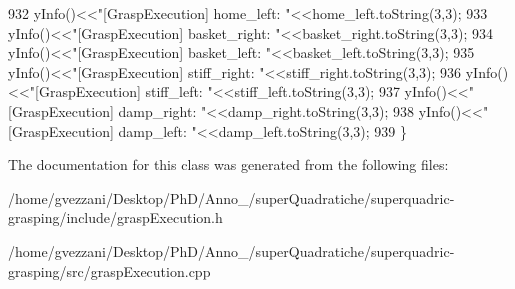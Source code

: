 \begin{DoxyCode}
932     yInfo()<<\textcolor{stringliteral}{"[GraspExecution] home\_left:       "}<<home\_left.toString(3,3);
933     yInfo()<<\textcolor{stringliteral}{"[GraspExecution] basket\_right:    "}<<basket\_right.toString(3,3);
934     yInfo()<<\textcolor{stringliteral}{"[GraspExecution] basket\_left:     "}<<basket\_left.toString(3,3);
935     yInfo()<<\textcolor{stringliteral}{"[GraspExecution] stiff\_right:     "}<<stiff\_right.toString(3,3);
936     yInfo()<<\textcolor{stringliteral}{"[GraspExecution] stiff\_left:      "}<<stiff\_left.toString(3,3);
937     yInfo()<<\textcolor{stringliteral}{"[GraspExecution] damp\_right:      "}<<damp\_right.toString(3,3);
938     yInfo()<<\textcolor{stringliteral}{"[GraspExecution] damp\_left:       "}<<damp\_left.toString(3,3);
939 \}
\end{DoxyCode}


The documentation for this class was generated from the following files\+:\begin{DoxyCompactItemize}
\item 
/home/gvezzani/\+Desktop/\+Ph\+D/\+Anno\+\_/super\+Quadratiche/superquadric-\/grasping/include/grasp\+Execution.\+h\item 
/home/gvezzani/\+Desktop/\+Ph\+D/\+Anno\+\_/super\+Quadratiche/superquadric-\/grasping/src/grasp\+Execution.\+cpp\end{DoxyCompactItemize}
